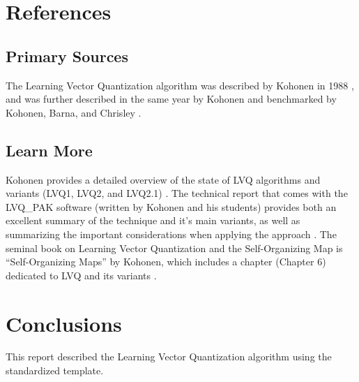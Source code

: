 \documentclass[a4paper, 11pt]{article}
\begin{document}



\section{References}
\label{sec:references}

% 
% 
\subsection{Primary Sources}
The Learning Vector Quantization algorithm was described by Kohonen in 1988 \cite{Kohonen1988}, and was further described in the same year by Kohonen \cite{Kohonen1988a} and benchmarked by Kohonen, Barna, and Chrisley \cite{Kohonen1988b}.

% 
% 
\subsection{Learn More}
Kohonen provides a detailed overview of the state of LVQ algorithms and variants (LVQ1, LVQ2, and LVQ2.1) \cite{Kohonen1990}. The technical report that comes with the LVQ\_PAK software (written by Kohonen and his students) provides both an excellent summary of the technique and it's main variants, as well as summarizing the important considerations when applying the approach \cite{Kohonen1996}.
The seminal book on Learning Vector Quantization and the Self-Organizing Map is ``Self-Organizing Maps'' by Kohonen, which includes a chapter (Chapter 6) dedicated to LVQ and its variants \cite{Kohonen1995}.

% 
% 
\section{Conclusions}
\label{sec:conclusions}
This report described the Learning Vector Quantization algorithm using the standardized template.
\end{document}
